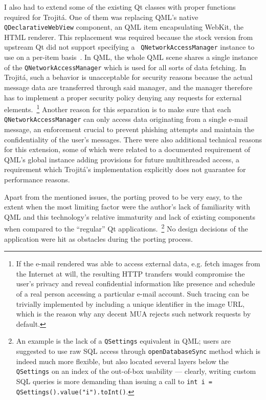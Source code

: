 \documentclass[trojita]{subfiles}
\begin{document}
I also had to extend some of the existing Qt classes with proper functions required for Trojitá.  One of them was
replacing QML's native {\tt QDeclarativeWebView} component, an QML item encapsulating WebKit, the HTML renderer.  This
replacement was required because the stock version from upstream Qt did not support specifying a {\tt
QNetworkAccessManager} instance to use on a per-item basis~\cite{jkt-qdeclarativewebview}.  In QML, the whole QML scene
shares a single instance of the {\tt QNetworkAccessManager} which is used for all sorts of data fetching.  In Trojitá,
such a behavior is unacceptable for security reasons because the actual message data are transferred through said
manager, and the manager therefore has to implement a proper security policy denying any requests for external
elements.~\footnote{If the e-mail rendered was able to access external data, e.g. fetch images from the Internet at
will, the resulting HTTP transfers would compromise the user's privacy and reveal confidential information like presence
and schedule of a real person accessing a particular e-mail account.  Such tracing can be trivially implemented by
including a unique identifier in the image URL, which is the reason why any decent MUA rejects such network requests by
default.}  Another reason for this separation is to make sure that each {\tt QNetworkAccessManager} can only access data
originating from a single e-mail message, an enforcement crucial to prevent phishing attempts and maintain the
confidentiality of the user's messages.  There were also additional technical reasons for this extension, some of which
were related to a documented requirement of QML's global instance adding provisions for future multithreaded access, a
requirement which Trojitá's implementation explicitly does not guarantee for performance reasons.

Apart from the mentioned issues, the porting proved to be very easy, to the extent when the most limiting factor were
the author's lack of familiarity with QML and this technology's relative immaturity and lack of existing components when
compared to the ``regular'' Qt applications.~\footnote{An example is the lack of a {\tt QSettings} equivalent in QML;
users are suggested to use raw SQL access through {\tt openDatabaseSync} method which is indeed much more flexible, but
also located several layers below the {\tt QSettings} on an index of the out-of-box usability --- clearly, writing
custom SQL queries is more demanding than issuing a call to {\tt int i = QSettings().value("i").toInt()}.}  No design
decisions of the application were hit as obstacles during the porting process.
\end{document}
